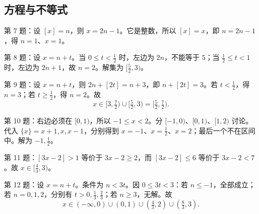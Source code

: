\documentclass[11pt,a4paper,fontset=fandol]{ctexart}
\begin{document}
\subsection{方程与不等式}
\begin{solution}第 7 题：设 $[x]=n$，则 $x=2n-1$。它是整数，所以 $[x]=x$，即 $n=2n-1$，得 $n=1$、$x=1$。\end{solution}
\begin{solution}第 8 题：设 $x=n+t$。当 $0\le t<\frac12$ 时，左边为 $2n$，不能等于 $5$；当 $\frac12\le t<1$ 时，左边为 $2n+1$，故 $n=2$。解集为 $[\frac52,3)$。\end{solution}
\begin{solution}第 9 题：设 $x=n+t$，则 $2n+[2t]=n+3$，即 $n+[2t]=3$。若 $t<\frac12$，得 $n=3$；若 $t\ge\frac12$，得 $n=2$。故
\[
x\in[3,\tfrac72)\cup[\tfrac52,3)=[\tfrac52,\tfrac72).
\]\end{solution}
\begin{solution}第 10 题：右边必须在 $[0,1)$，所以 $-1\le x<2$。分 $[-1,0)$、$[0,1)$、$[1,2)$ 讨论。代入 $\{x\}=x+1,x,x-1$，分别得到 $x=-1$、$x=\frac12$、$x=2$；最后一个不在区间中。解为 $-1,\frac12$。\end{solution}
\begin{solution}第 11 题：$[3x-2]>1$ 等价于 $3x-2\ge2$，而 $[3x-2]\le6$ 等价于 $3x-2<7$。故 $x\in[\frac43,3)$。\end{solution}
\begin{solution}第 12 题：设 $x=n+t$。条件为 $n<3t$。因 $0\le3t<3$：若 $n\le-1$，全部成立；若 $n=0,1,2$，分别有 $t>0,\frac13,\frac23$；若 $n\ge3$，无解。故
\[
x\in(-\infty,0)\cup(0,1)\cup(\tfrac43,2)\cup(\tfrac83,3).
\]\end{solution}
\end{document}
